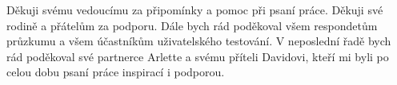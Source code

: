 Děkuji svému vedoucímu za připomínky a pomoc při psaní práce. Děkuji své rodině a přátelům za podporu. Dále bych rád poděkoval všem respondetům průzkumu a všem účastníkům uživatelského testování. V neposlední řadě bych rád poděkoval své partnerce Arlette a svému příteli Davidovi, kteří mi byli po celou dobu psaní práce inspirací i podporou.